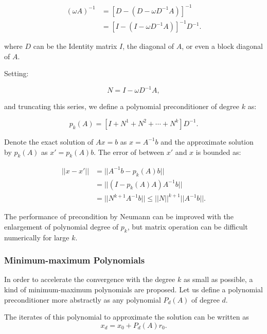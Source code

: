 \begin{equation}
\begin{aligned}
(\omega A)^{-1} &= [D-(D- \omega D^{-1}A)]^{-1} \\ &= [I-(I- \omega D^{-1}A)]^{-1}D^{-1}. 
\end{aligned}
\end{equation}

where $D$ can be the Identity matrix $I$, the diagonal of $A$, or even a block diagonal of $A$.

Setting:

\begin{equation}
N=I- \omega D^{-1}A,
\end{equation}

and truncating this series, we define a polynomial preconditioner of degree $k$ as:

\begin{equation}
p_{k}(A) = [I+N^1+N^2+\cdots+N^k]D^{-1}.
\end{equation}

Denote the exact solution of $Ax=b$ as $x=A^{-1}b$ and the approximate solution by $p_{k}(A)$ as $x'=p_{k}(A)b$. The error of between $x'$ and $x$ is bounded as:

\begin{equation}
\begin{aligned}
||x-x'|| &= ||A^{-1}b - p_{k}(A)b|| \\ &= ||(I-p_{k}(A)A)A^{-1}b|| \\ &= ||N^{k+1}A^{-1}b|| \leq ||N||^{k+1}||A^{-1}b||.
\end{aligned}
\end{equation}

The performance of precondition by Neumann can be improved with the enlargement of polynomial degree of $p_k$, but matrix operation can be difficult numerically for large $k$.

\subsubsection{Minimum-maximum Polynomials}

In order to accelerate the convergence with the degree $k$ as small as possible, a kind of minimum-maximum polynomials are proposed. Let us define a polynomial preconditioner more abstractly as any polynomial $P_d(A)$ of degree $d$.

The iterates of this polynomial to approximate the solution can be written as 
\begin{equation}
x_d=x_0+P_d(A)r_0.
\end{equation}

